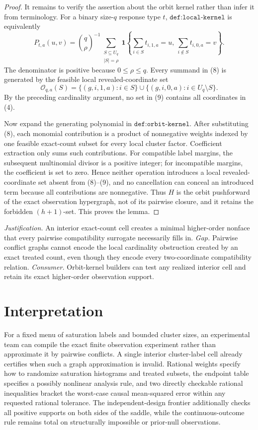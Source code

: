 \documentclass{article}
\begin{document}
\begin{proof}
It remains to verify the assertion about the orbit kernel rather than infer it from terminology.  For a binary size-\(q\) response type \(t\), \(\texttt{def:local-kernel}\) is equivalently
\[
 P_{t,a}(u,v)
 =\binom q\rho^{-1}
   \sum_{\substack{S\subseteq U_q\\ |S|=\rho}}
   \mathbf 1\!\left\{
      \sum_{i\in S}t_{i,1,a}=u,
      \ \sum_{i\notin S}t_{i,0,a}=v
   \right\}.
 \tag{8}
\]
The denominator is positive because \(0\le\rho\le q\).  Every summand in (8) is generated by the feasible local revealed-coordinate set
\[
 \mathcal O_{q,a}(S)
 =\{(g,i,1,a):i\in S\}
   \mathbin\cup
   \{(g,i,0,a):i\in U_q\setminus S\}.
 \tag{9}
\]
By the preceding cardinality argument, no set in (9) contains all coordinates in (4).

Now expand the generating polynomial in \(\texttt{def:orbit-kernel}\).  After substituting (8), each monomial contribution is a product of nonnegative weights indexed by one feasible exact-count subset for every local cluster factor.  Coefficient extraction only sums such contributions.  For compatible label margins, the subsequent multinomial divisor is a positive integer; for incompatible margins, the coefficient is set to zero.  Hence neither operation introduces a local revealed-coordinate set absent from (8)--(9), and no cancellation can conceal an introduced term because all contributions are nonnegative.  Thus \(H\) is the orbit pushforward of the exact observation hypergraph, not of its pairwise closure, and it retains the forbidden \((h+1)\)-set.  This proves the lemma.
\end{proof}
\par\smallskip\noindent \textit{Justification.} An interior exact-count cell creates a minimal higher-order nonface that every pairwise compatibility surrogate necessarily fills in. \textit{Gap.} Pairwise conflict graphs cannot encode the local cardinality obstruction created by an exact treated count, even though they encode every two-coordinate compatibility relation. \textit{Consumer.} Orbit-kernel builders can test any realized interior cell and retain its exact higher-order observation support.

\section{Interpretation}

For a fixed menu of saturation labels and bounded cluster sizes, an experimental team can compile the exact finite observation experiment rather than approximate it by pairwise conflicts. A single interior cluster-label cell already certifies when such a graph approximation is invalid. Rational weights specify how to randomize saturation histograms and treated subsets, the endpoint table specifies a possibly nonlinear analysis rule, and two directly checkable rational inequalities bracket the worst-case causal mean-squared error within any requested rational tolerance. The independent-design frontier additionally checks all positive supports on both sides of the saddle, while the continuous-outcome rule remains total on structurally impossible or prior-null observations.
\end{document}
